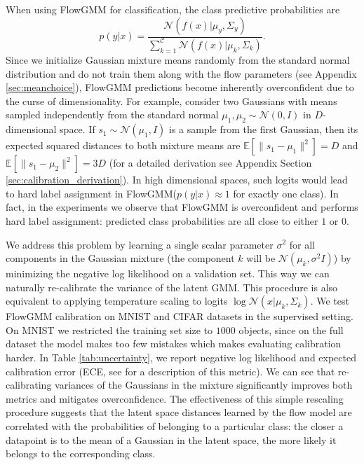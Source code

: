 \documentclass{article}
\newcommand{\method}{FlowGMM\xspace}
\newcommand{\mC}{\mathcal{C}}
\newcommand{\mN}{\mathcal{N}}
\begin{document}
When using \method for classification, the class predictive probabilities are 
\begin{equation*}
    p(y|x) = 
    \frac{\mN \left(f(x) | \mu_{y}, \Sigma_{y}\right)}{\sum_{k=1}^{\mC} \mN(f(x) \vert \mu_k, \Sigma_k)}.
\end{equation*}
Since we initialize Gaussian mixture means randomly from the standard normal distribution and do not train them along with the flow parameters (see Appendix \ref{sec:meanchoice}), \method predictions become inherently overconfident due to the curse of dimensionality.
For example, consider two Gaussians with means sampled independently from the standard normal $\mu_1, \mu_2 \sim \mN(0, I)$ in $D$-dimensional space.  If $s_1 \sim \mN(\mu_1, I)$ is a sample from the first Gaussian, then its expected squared distances to both mixture means are $\mathbb{E} \left[\|s_1 - \mu_1\|^2 \right] = D$ and $\mathbb{E} \left[ \|s_1 - \mu_2\|^2 \right] = 3D$ (for a detailed derivation see Appendix Section \ref{sec:calibration_derivation}). In high dimensional spaces, such logits would lead to hard label assignment in \method ($p(y|x) \approx 1$ for exactly one class).
In fact, in the experiments we observe that \method is overconfident and performs hard label assignment: predicted class probabilities are all close to either $1$ or $0$. 

We address this problem by learning a single scalar parameter $\sigma^2$ for all components in the Gaussian mixture (the component $k$ will be $\mN(\mu_k, \sigma^2 I)$) by minimizing the negative log likelihood on a validation set. This way we can naturally re-calibrate the variance of the latent GMM.
This procedure is also equivalent to applying temperature scaling \citep{weinberger2017calibration} to logits $\log \mN(x|\mu_k, \Sigma_k)$.
We test FlowGMM calibration on MNIST and CIFAR datasets in the supervised setting.
On MNIST we restricted the training set size to $1000$ objects, since on the full dataset the model makes too few mistakes which makes evaluating calibration harder. 
In Table \ref{tab:uncertainty}, we report negative log likelihood and expected calibration error 
(ECE, see \citet{weinberger2017calibration} for  a description of this metric).
We can see that re-calibrating variances of the Gaussians in the mixture significantly improves both metrics and mitigates overconfidence. 
The effectiveness of this simple rescaling procedure suggests that the latent space distances learned by the flow model are correlated with the probabilities of belonging to a particular class: the closer a datapoint is to the mean of a Gaussian in the latent space, the more likely it belongs to the corresponding class.
\end{document}
